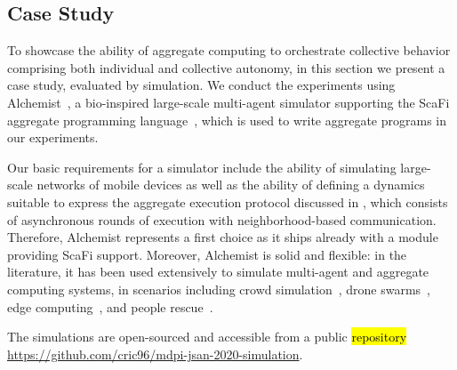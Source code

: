 \documentclass[jsan,article,accept,moreauthors,pdftex]{Definitions/mdpi}
\begin{document}
\begin{paracol}{2}
\section{Case Study}
\label{s:eval}

To showcase the ability of aggregate computing to orchestrate collective behavior
 comprising both individual and collective autonomy, in this section we present a case study, evaluated by simulation. 
% 
We conduct the experiments using Alchemist~\cite{DBLP:journals/jos/PianiniMV13}, a bio-inspired large-scale multi-agent simulator
 supporting the ScaFi aggregate programming language~\cite{Casadei2016mass}, which is used to write aggregate programs in our experiments. 

Our basic requirements for a simulator
 include the ability of
 simulating large-scale networks of mobile devices
 as well as the ability of 
 defining a dynamics suitable to express
 the aggregate execution protocol discussed in , which consists of asynchronous rounds of execution with neighborhood-based communication.
%
Therefore, Alchemist represents a first choice 
 as it ships already with a module providing 
 ScaFi support.
%
Moreover, Alchemist is solid and flexible:
 in the literature, it has been used extensively 
 to simulate multi-agent and aggregate computing systems,
 in scenarios including 
 crowd simulation~\cite{DBLP:journals/computer/BealPV15}, 
 drone swarms~\cite{DBLP:journals/eaai/CasadeiVAPD21},
 edge computing~\cite{casadei2019fmec}, 
 and people rescue~\cite{viroli2017ijaose-aggregate-plans}.

%
%
The simulations are open-sourced and accessible from a public \hl{repository} %
 \url{https://github.com/cric96/mdpi-jsan-2020-simulation}.


%


\end{paracol}
\end{document}
